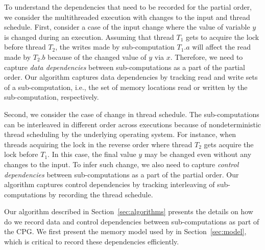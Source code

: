 To understand the dependencies that need to be recorded for the partial order, we consider the multithreaded execution with changes to the input and thread schedule.  First, consider a case of the input change where the value of variable $y$ is changed during an execution. Assuming that thread $T_1$ gets to acquire the lock before thread $T_2$, the writes made by sub-computation $T_1.a$ will affect the read made by $T_2.b$ because of the changed value of $y$ via  $x$. Therefore, we need to capture {\em data dependencies} between sub-computations as a part of the partial order. Our algorithm captures data dependencies by tracking read and write sets of a sub-computation, i.e., the set of memory locations read or written by the sub-computation, respectively.

Second, we consider the case of change in thread schedule. The sub-computations can be interleaved in different order across executions because of nondeterministic thread scheduling by the underlying operating system. For instance, when threads acquiring the lock in the reverse order where thread $T_2$ gets acquire the lock before $T_1$. In this case, the final value $y$ may be changed even without any changes to the input. To infer such change, we also need to capture {\em control dependencies}   between sub-computations as a part of the partial order. Our algorithm captures control dependencies by tracking interleaving of sub-computations by recording the thread schedule. 




Our algorithm described in Section~\ref{sec:algorithms} presents the details on how do we record data and control dependencies between sub-computations as part of the CPG. We first present the memory model used by \projecttitle in Section~\ref{sec:model}, which is critical to record these dependencies efficiently.














 